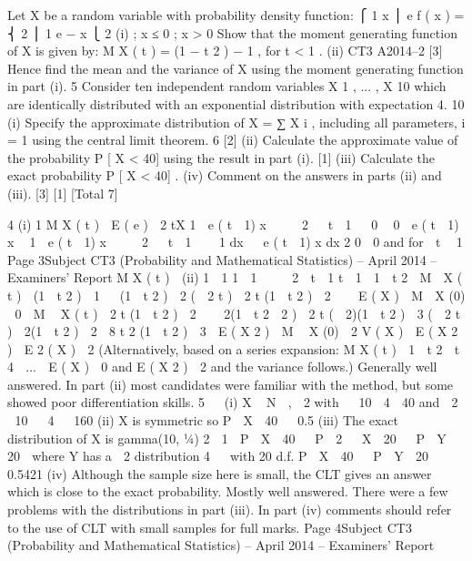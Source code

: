 Let X be a random variable with probability density function:
⎧ 1 x
⎪ e
f ( x ) = ⎨ 2
⎪ 1 e − x
⎩ 2
(i)
; x ≤ 0
; x > 0
Show that the moment generating function of X is given by:
M X ( t ) = (1 − t 2 ) − 1 ,
for t < 1 .
(ii)
CT3 A2014–2
[3]
Hence find the mean and the variance of X using the moment generating
function in part (i).
5
Consider ten independent random variables X 1 , ... , X 10 which are identically
distributed with an exponential distribution with expectation 4.
10
(i)
Specify the approximate distribution of X = ∑ X i , including all parameters,
i = 1
using the central limit theorem.
6
[2]
(ii) Calculate the approximate value of the probability P [ X < 40] using the result
in part (i).
[1]
(iii) Calculate the exact probability P [ X < 40] .
(iv) Comment on the answers in parts (ii) and (iii).
[3]
[1]
[Total 7]

4
(i)
1
M X ( t )  E ( e ) 
2
tX
1  e ( t  1) x 
 

2   t  1  
0

0
 e
( t  1) x

1  e ( t  1) x 
 

2   t  1  

1
dx   e ( t  1) x dx
2
0

0
and for  t  1
Page 3Subject CT3 (Probability and Mathematical Statistics) – April 2014 – Examiners’ Report
M X ( t ) 
(ii)
1  1
1 
1


 
2  t  1 t  1  1  t 2

M  X ( t )  (1  t 2 )  1   (1  t 2 )  2 (  2 t )  2 t (1  t 2 )  2


 E ( X )  M  X (0)  0

M  X ( t )  2 t (1  t 2 )  2

  2(1  t
2  2
)
 2 t (  2)(1  t 2 )  3 (  2 t )
 2(1  t 2 )  2  8 t 2 (1  t 2 )  3
 E ( X 2 )  M  X (0)  2
V ( X )  E ( X 2 )  E 2 ( X )  2
(Alternatively, based on a series expansion:
M X ( t )  1  t 2  t 4  ...  E ( X )  0 and E ( X 2 )  2 and the variance follows.)
Generally well answered. In part (ii) most candidates were familiar with the method, but
some showed poor differentiation skills.
5


(i) X ~ N  ,  2 with   10  4  40 and  2  10   4   160
(ii) X is symmetric so P  X  40   0.5
(iii) The exact distribution of X is gamma(10, 1⁄4)
2
 1

P  X  40   P  2   X  20   P  Y  20  where Y has a  2 distribution
4


with 20 d.f.
P  X  40   P  Y  20   0.5421
(iv)
Although the sample size here is small, the CLT gives an answer which is
close to the exact probability.
Mostly well answered. There were a few problems with the distributions in part (iii). In part
(iv) comments should refer to the use of CLT with small samples for full marks.
Page 4Subject CT3 (Probability and Mathematical Statistics) – April 2014 – Examiners’ Report
